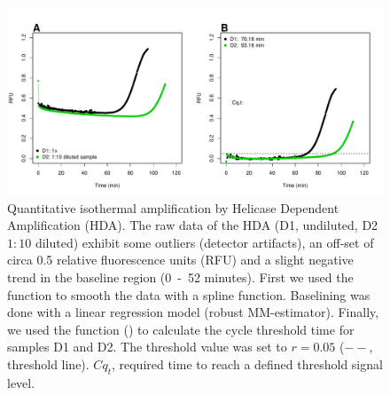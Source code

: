 \begin{figure}[htbp]
  \centering
  \includegraphics[clip=true, width=14.5cm]{figures/qIA.pdf}
  \caption{Quantitative isothermal amplification by Helicase Dependent 
Amplification (HDA).  The raw data of the HDA (D1, undiluted, D2 
$1:10$ diluted) exhibit some outliers (detector artifacts), an off-set of circa 
0.5 relative fluorescence units (RFU) and a slight negative trend in the 
baseline region (0~-~52 minutes).  First we used the  
function to smooth the data with a spline function. Baselining was done with a 
linear regression model (robust MM-estimator). Finally, we used the 
 function () to calculate the cycle threshold time 
for samples D1 and D2. The threshold value was set to $r = 0.05$ ($--$, 
threshold line). $Cq_{t}$, required time to reach a defined threshold signal 
level.}
  \label{figure:qIA}
\end{figure}

